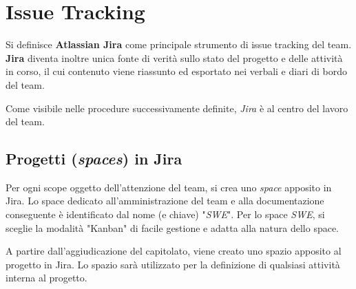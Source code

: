 
\section{Issue Tracking}
Si definisce \textbf{Atlassian Jira} come principale strumento di issue tracking del team.
\textbf{Jira} diventa inoltre unica fonte di verità sullo stato del progetto e delle attività in corso, il cui contenuto
viene riassunto ed esportato nei verbali e diari di bordo del team.

Come visibile nelle procedure successivamente definite, \textit{Jira} è al centro del lavoro del team.

\subsection{Progetti (\textit{spaces}) in Jira}

Per ogni scope oggetto dell'attenzione del team, si crea uno \textit{space} apposito in Jira.
Lo space dedicato all'amministrazione del team e alla documentazione conseguente è identificato dal nome (e chiave) "\textit{SWE}".
Per lo space \textit{SWE}, si sceglie la modalità "Kanban" di facile gestione e adatta alla natura dello space.

A partire dall'aggiudicazione del capitolato, viene creato uno spazio apposito al progetto in Jira.
Lo spazio sarà utilizzato per la definizione di qualsiasi attività interna al progetto.